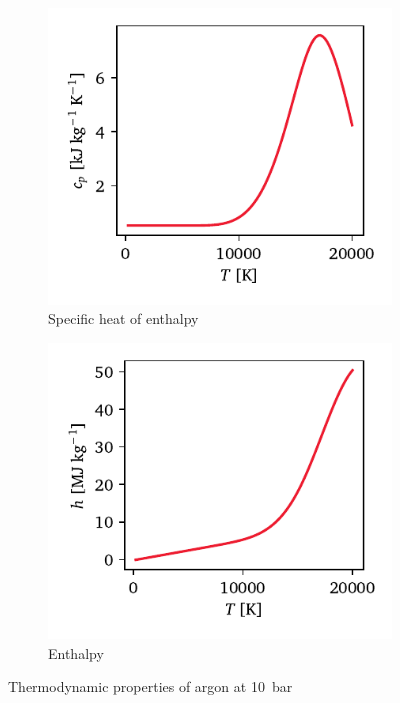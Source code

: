         \begin{figure}[h]
            \centering
            \begin{subfigure}[t]{0.47\textwidth}
                \centering
                \includegraphics[width=\textwidth]{assets/4 models/Ar10_cp.pdf}
                \caption{Specific heat of enthalpy}
                \label{fig:argon_cp}
            \end{subfigure}
            \hfill
            \begin{subfigure}[t]{0.47\textwidth}
                \centering
                \includegraphics[width=\textwidth]{assets/4 models/Ar10_h.pdf}
                \caption{Enthalpy}
                \label{fig:argon_h}
            \end{subfigure}
            \caption{Thermodynamic properties of argon at \qty{10}{bar}}
            \label{fig:argon_thermo}
        \end{figure}

